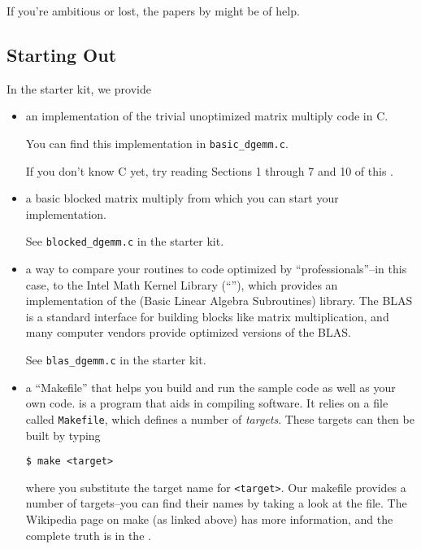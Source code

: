 \documentclass[11pt]{article}
\begin{document}
If you're ambitious or lost, the papers by
\citet{lam1991cache,bilmes1997optimizing,whaley_automated_2001} might
be of help.

\subsection*{Starting Out}

In the starter kit, we provide
\begin{itemize}
  \item an implementation of the trivial unoptimized matrix multiply
  code in C. 

  You can find this implementation in \verb|basic_dgemm.c|.

  If you don't know C yet, try reading Sections 1 through 7 and 10
  of this
  .

  \item a basic blocked matrix multiply from which
  you can start your implementation. 

  See \verb|blocked_dgemm.c| in the starter kit.

  \item a way to compare your routines to code optimized by
  ``professionals''--in this case, to the Intel Math Kernel Library
  (``''),
  which provides an implementation of the
  (Basic Linear Algebra Subroutines) library. The BLAS is a standard
  interface for building blocks like matrix multiplication, and many
  computer vendors provide optimized versions of the BLAS.

  See \verb|blas_dgemm.c| in the starter kit.

  \item a ``Makefile'' that helps you build and run the sample
    code as well as your own code.
     is 
    a program that aids in compiling software. It relies on a file
    called \texttt{Makefile}, which defines a number of
    \emph{targets}. These targets can then be built by typing
    \begin{lstlisting}
$ make <target>
\end{lstlisting}
    where you substitute the target name for \verb|<target>|.  Our
    makefile provides a number of targets--you can find their names by
    taking a look at the file. The Wikipedia page on make (as linked
    above) has more information, and the complete truth is in the
    .

\end{itemize}
\end{document}
